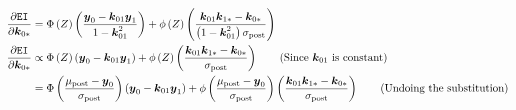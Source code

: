 \documentclass[11pt]{article}
\def\EI{\texttt{EI}}
\newcommand{\bs}[1]{\boldsymbol{#1}}
\def\bsy{\bs{y}}
\def\bsk{\bs{k}}
\begin{document}
{\begin{align*}
\frac{\partial \EI}{\partial \bsk_{0*}} &= \Phi\left(Z\right)\left(\frac{\bsy_{0} - \bsk_{01}\bsy_{1}}{1 - \bsk_{01}^2}\right) + \phi\left(Z\right)\left(\frac{\bsk_{01}\bsk_{1*} - \bsk_{0*}}{\left(1 - \bsk_{01}^{2}\right)\sigma_{\textrm{post}}}\right)\\
\frac{\partial \EI}{\partial \bsk_{0*}} &\propto \Phi\left(Z\right)\left(\bsy_{0} - \bsk_{01}\bsy_{1}\right) + \phi\left(Z\right)\left(\frac{\bsk_{01}\bsk_{1*} - \bsk_{0*}}{\sigma_{\textrm{post}}}\right)\tag{Since $\bsk_{01}$ is constant}\\
&= \Phi\left(\frac{\mu_{\textrm{post}} - \bsy_{0}}{\sigma_{\textrm{post}}}\right)\left(\bsy_{0} - \bsk_{01}\bsy_{1}\right) + \phi\left(\frac{\mu_{\textrm{post}} - \bsy_{0}}{\sigma_{\textrm{post}}}\right)\left(\frac{\bsk_{01}\bsk_{1*} - \bsk_{0*}}{\sigma_{\textrm{post}}}\right)\tag{Undoing the substitution}\\
\end{align*}
}%
\vfill{}
\end{document}
